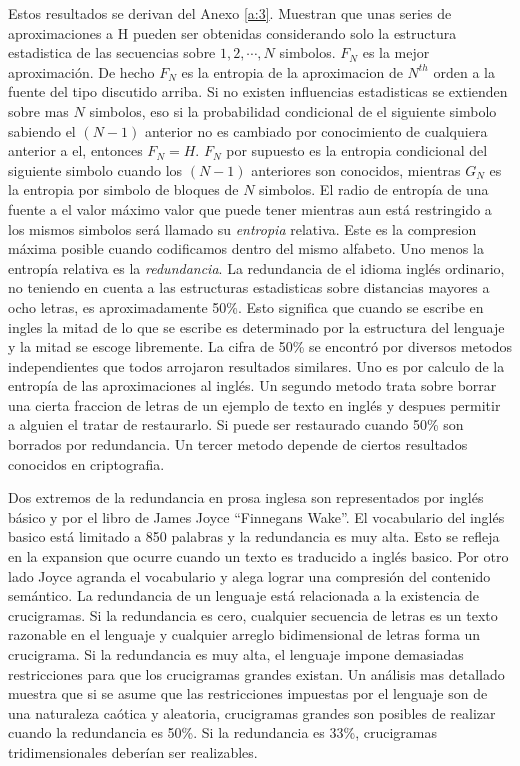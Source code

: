 Estos resultados se derivan del Anexo \ref{a:3}. Muestran que
unas series de aproximaciones a H pueden ser obtenidas considerando
solo la estructura estadistica de las secuencias sobre $1, 2, \cdots,
N$ simbolos. $F_{N}$ es la mejor aproximaci\'{o}n. De hecho $F_{N}$ es
la entropia de la aproximacion de $N^{th}$ orden a la fuente del tipo
discutido arriba. Si no existen influencias estadisticas se extienden
sobre mas $N$ simbolos, eso si la probabilidad condicional de el
siguiente simbolo sabiendo el $(N-1)$ anterior no es cambiado por
conocimiento de cualquiera anterior a el, entonces $F_{N} =
H$. $F_{N}$ por supuesto es la entropia condicional del siguiente
simbolo cuando los $(N-1)$ anteriores son conocidos, mientras $G_{N}$
es la entropia por simbolo de bloques de $N$ simbolos.  El radio de
entrop\'{i}a de una fuente a el valor m\'{a}ximo valor que puede tener
mientras aun est\'{a} restringido a los mismos simbolos ser\'{a}
llamado su \textit{entropia} relativa. Este es la compresion
m\'{a}xima posible cuando codificamos dentro del mismo alfabeto. Uno
menos la entrop\'{i}a relativa es la \textit{redundancia}. La
redundancia de el idioma ingl\'{e}s ordinario, no teniendo en cuenta a
las estructuras estadisticas sobre distancias mayores a ocho letras,
es aproximadamente 50\%. Esto significa que cuando se escribe en
ingles la mitad de lo que se escribe es determinado por la estructura
del lenguaje y la mitad se escoge libremente. La cifra de 50\% se
encontr\'{o} por diversos metodos independientes que todos arrojaron
resultados similares. Uno es por calculo de la entrop\'{i}a de las
aproximaciones al ingl\'{e}s. Un segundo metodo trata sobre borrar una
cierta fraccion de letras de un ejemplo de texto en ingl\'{e}s y
despues permitir a alguien el tratar de restaurarlo. Si puede ser
restaurado cuando 50\% son borrados por redundancia. Un tercer metodo
depende de ciertos resultados conocidos en criptografia.

Dos extremos de la redundancia en prosa inglesa son representados por
ingl\'{e}s b\'{a}sico y por el libro de James Joyce ``Finnegans
Wake''. El vocabulario del ingl\'{e}s basico est\'{a} limitado a 850
palabras y la redundancia es muy alta. Esto se refleja en la expansion
que ocurre cuando un texto es traducido a ingl\'{e}s basico. Por otro
lado Joyce agranda el vocabulario y alega lograr una compresi\'{o}n
del contenido sem\'{a}ntico.  La redundancia de un lenguaje est\'{a}
relacionada a la existencia de crucigramas. Si la redundancia es cero,
cualquier secuencia de letras es un texto razonable en el lenguaje y
cualquier arreglo bidimensional de letras forma un crucigrama. Si la
redundancia es muy alta, el lenguaje impone demasiadas restricciones
para que los crucigramas grandes existan. Un an\'{a}lisis mas
detallado muestra que si se asume que las restricciones impuestas por
el lenguaje son de una naturaleza ca\'{o}tica y aleatoria, crucigramas
grandes son posibles de realizar cuando la redundancia es 50\%. Si la
redundancia es 33\%, crucigramas tridimensionales deber\'{i}an ser
realizables.

\clearpage
